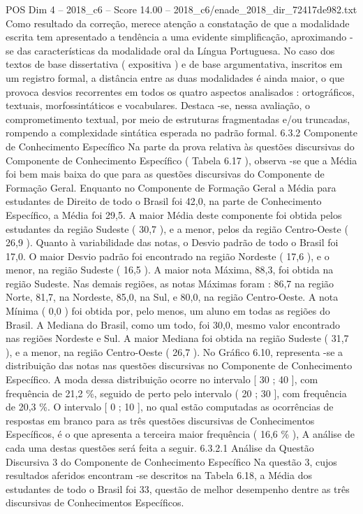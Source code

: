 \begin{textsample}{POS Dim 4 – 2018\_c6 – Score 14.00 – 2018\_c6/enade\_2018\_dir\_72417de982.txt}
Como resultado da correção, merece atenção a constatação de que a modalidade escrita tem apresentado a tendência a uma evidente simplificação, aproximando -se das características da modalidade oral da Língua Portuguesa.
No caso dos textos de base dissertativa ( expositiva ) e de base argumentativa, inscritos em um registro formal, a distância entre as duas modalidades é ainda maior, o que provoca desvios recorrentes em todos os quatro aspectos analisados : ortográficos, textuais, morfossintáticos e vocabulares.
Destaca -se, nessa avaliação, o comprometimento textual, por meio de estruturas fragmentadas e/ou truncadas, rompendo a complexidade sintática esperada no padrão formal. 6.3.2 Componente de Conhecimento Específico Na parte da prova relativa às questões discursivas do Componente de Conhecimento Específico ( Tabela 6.17 ), observa -se que a Média foi bem mais baixa do que para as questões discursivas do Componente de Formação Geral.
Enquanto no Componente de Formação Geral a Média para estudantes de Direito de todo o Brasil foi 42,0, na parte de Conhecimento Específico, a Média foi 29,5.
A maior Média deste componente foi obtida pelos estudantes da região Sudeste ( 30,7 ), e a menor, pelos da região Centro-Oeste ( 26,9 ).
Quanto à variabilidade das notas, o Desvio padrão de todo o Brasil foi 17,0.
O maior Desvio padrão foi encontrado na região Nordeste ( 17,6 ), e o menor, na região Sudeste ( 16,5 ).
A maior nota Máxima, 88,3, foi obtida na região Sudeste.
Nas demais regiões, as notas Máximas foram : 86,7 na região Norte, 81,7, na Nordeste, 85,0, na Sul, e 80,0, na região Centro-Oeste.
A nota Mínima ( 0,0 ) foi obtida por, pelo menos, um aluno em todas as regiões do Brasil.
A Mediana do Brasil, como um todo, foi 30,0, mesmo valor encontrado nas regiões Nordeste e Sul.
A maior Mediana foi obtida na região Sudeste ( 31,7 ), e a menor, na região Centro-Oeste ( 26,7 ).
No Gráfico 6.10, representa -se a distribuição das notas nas questões discursivas no Componente de Conhecimento Específico.
A moda dessa distribuição ocorre no intervalo [ 30 ; 40 ], com frequência de 21,2 \%, seguido de perto pelo intervalo ( 20 ; 30 ], com frequência de 20,3 \%.
O intervalo [ 0 ; 10 ], no qual estão computadas as ocorrências de respostas em branco para as três questões discursivas de Conhecimentos Específicos, é o que apresenta a terceira maior frequência ( 16,6 \% ), A análise de cada uma destas questões será feita a seguir. 6.3.2.1 Análise da Questão Discursiva 3 do Componente de Conhecimento Específico Na questão 3, cujos resultados aferidos encontram -se descritos na Tabela 6.18, a Média dos estudantes de todo o Brasil foi 33, questão de melhor desempenho dentre as três discursivas de Conhecimentos Específicos.

\end{textsample}
